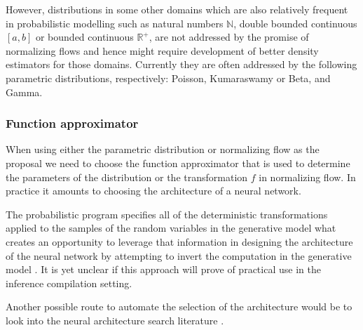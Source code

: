 \documentclass[12pt]{article}
\begin{document}

However, distributions in some other domains which are also relatively frequent in probabilistic modelling such as natural numbers $\mathbb{N}$, double bounded continuous $[a,b]$ or bounded continuous $\mathbb{R}^+$, are not addressed by the promise of normalizing flows and hence might require development of better density estimators for those domains.
Currently they are often addressed by the following parametric distributions, respectively: Poisson, Kumaraswamy or Beta, and Gamma.




\subsubsection*{Function approximator}
When using either the parametric distribution or normalizing flow as the proposal we need to choose the function approximator that is used to determine the parameters of the distribution or the transformation $f$ in normalizing flow.
In practice it amounts to choosing the architecture of a neural network.

The probabilistic program specifies all of the deterministic transformations applied to the samples of the random variables in the generative model
what creates an opportunity to leverage that information in designing the architecture of the neural network by attempting to invert the computation in the generative model \citep{TavaresEtAl2016,TavaresEtAl2017}.
It is yet unclear if this approach will prove of practical use in the inference compilation setting.

Another possible route to automate the selection of the architecture would be to look into the neural architecture search literature \citep{ElskenEtAl2018,ZophLe2017,pham18a}.







\end{document}
